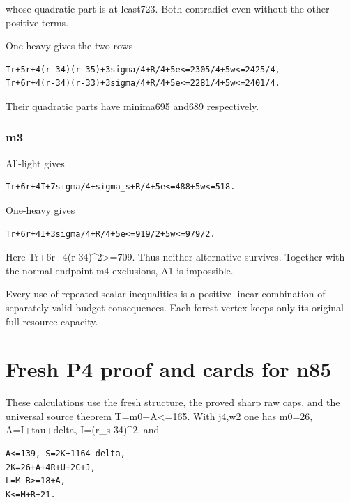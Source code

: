 \documentclass[10pt,a4paper]{article}
\theoremstyle{definition}
\begin{document}
whose quadratic part is at least723. Both contradict even without the
other positive terms.

One-heavy gives the two rows

\begin{lstlisting}
Tr+5r+4(r-34)(r-35)+3sigma/4+R/4+5e<=2305/4+5w<=2425/4,
Tr+6r+4(r-34)(r-33)+3sigma/4+R/4+5e<=2281/4+5w<=2401/4.
\end{lstlisting}

Their quadratic parts have minima695 and689 respectively.

\hypertarget{m3}{%
\subsubsection{m3}\label{m3}}

All-light gives

\begin{lstlisting}
Tr+6r+4I+7sigma/4+sigma_s+R/4+5e<=488+5w<=518.
\end{lstlisting}

One-heavy gives

\begin{lstlisting}
Tr+6r+4I+3sigma/4+R/4+5e<=919/2+5w<=979/2.
\end{lstlisting}

Here Tr+\allowbreak{}6r+\allowbreak{}4(r-34)\^{}2\textgreater=\allowbreak{}709. Thus neither alternative
survives. Together with the normal-endpoint m4 exclusions,\allowbreak{} A1 is
impossible.

Every use of repeated scalar inequalities is a positive linear
combination of separately valid budget consequences. Each forest vertex
keeps only its original full resource capacity.

\clearpage
\hypertarget{fresh-p4-proof-and-cards-for-n85}{%
\section{Fresh P4 proof and cards for
n85}\label{fresh-p4-proof-and-cards-for-n85}}

These calculations use the fresh structure,\allowbreak{} the proved sharp raw caps,\allowbreak{}
and the universal source theorem T=\allowbreak{}m0+\allowbreak{}A\textless=\allowbreak{}165. With j4,\allowbreak{}w2 one has
m0=\allowbreak{}26,\allowbreak{} A=\allowbreak{}I+\allowbreak{}tau+\allowbreak{}delta,\allowbreak{} I=\allowbreak{}(r\_\allowbreak{}s-34)\^{}2,\allowbreak{} and

\begin{lstlisting}
A<=139, S=2K+1164-delta,
2K=26+A+4R+U+2C+J,
L=M-R>=18+A,
K<=M+R+21.
\end{lstlisting}
\end{document}
